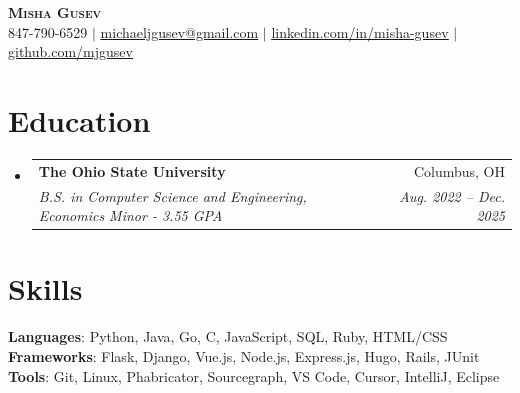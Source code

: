 \documentclass[letterpaper,11pt]{article}
\makeatletter
\newcommand{\resumeSubheading}[4]{
  \vspace{-2pt}\item
    \begin{tabular*}{0.97\textwidth}[t]{l@{\extracolsep{\fill}}r}
      \textbf{#1} & #2 \\
      \textit{\small#3} & \textit{\small #4} \\
    \end{tabular*}\vspace{-7pt}
}
\newcommand{\resumeSubHeadingListStart}{\begin{itemize}[leftmargin=0.15in, label={}]}
\newcommand{\resumeSubHeadingListEnd}{\end{itemize}}
\makeatother
\begin{document}

\begin{center}
    \textbf{\Huge \scshape Misha Gusev} \\ \vspace{1pt}
    \small 847-790-6529 $|$ \href{mailto:michaeljgusev@gmail.com}{\underline{michaeljgusev@gmail.com}} $|$ 
    \href{https://www.linkedin.com/in/misha-gusev/}{\underline{linkedin.com/in/misha-gusev}} $|$
    \href{https://github.com/mjgusev}{\underline{github.com/mjgusev}}
\end{center}

\section{Education}
  \resumeSubHeadingListStart
    \resumeSubheading
      {The Ohio State University}{Columbus, OH}
      {B.S. in Computer Science and Engineering, Economics Minor - 3.55 GPA}{Aug. 2022 -- Dec. 2025}
  \resumeSubHeadingListEnd

\section{Skills}
 \begin{itemize}[leftmargin=0.15in, label={}]
    \small{\item{
     \textbf{Languages}{: Python, Java, Go, C, JavaScript, SQL, Ruby, HTML/CSS} \\
     \textbf{Frameworks}{: Flask, Django, Vue.js, Node.js, Express.js, Hugo, Rails, JUnit} \\
     \textbf{Tools}{: Git, Linux, Phabricator, Sourcegraph, VS Code, Cursor, IntelliJ, Eclipse} }}
 \end{itemize}

\end{document}
